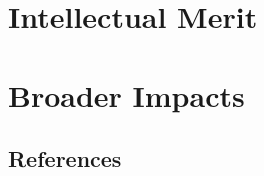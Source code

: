 \documentclass[11pt]{article}
\begin{document}
	
	
\section*{Intellectual Merit}
%	
%	
	
	
	
\section*{Broader Impacts}
%	
%	
%	
	
	
\subsection*{References}
	
	
	
	
\end{document}
